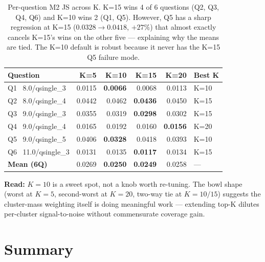 \documentclass[10pt,a4paper]{article}
\newcommand{\good}[1]{\textcolor{green!50!black}{\textbf{#1}}}
\newcommand{\bad}[1]{\textcolor{red!60!black}{#1}}
\begin{document}
\begin{table}[H]
\centering
\small
\begin{tabular}{l r r r r l}
\toprule
\textbf{Question} & \textbf{K=5} & \textbf{K=10} & \textbf{K=15} & \textbf{K=20} & \textbf{Best K} \\
\midrule
Q1 \ 8.0/qsingle\_3   & 0.0115 & \good{0.0066} & 0.0068 & 0.0113 & K=10 \\
Q2 \ 8.0/qsingle\_4   & 0.0442 & 0.0462 & \good{0.0436} & 0.0450 & K=15 \\
Q3 \ 9.0/qsingle\_3   & 0.0355 & 0.0319 & \good{0.0298} & 0.0302 & K=15 \\
Q4 \ 9.0/qsingle\_4   & 0.0165 & 0.0192 & 0.0160 & \good{0.0156} & K=20 \\
Q5 \ 9.0/qsingle\_5   & 0.0406 & \good{0.0328} & \bad{0.0418} & 0.0393 & K=10 \\
Q6 \ 11.0/qsingle\_3  & 0.0131 & 0.0135 & \good{0.0117} & 0.0134 & K=15 \\
\midrule
\textbf{Mean (6Q)}    & 0.0269 & \good{0.0250} & \good{0.0249} & 0.0258 & --- \\
\bottomrule
\end{tabular}
\caption{Per-question M2 JS across K. K=15 wins 4 of 6 questions (Q2, Q3, Q4, Q6) and K=10 wins 2 (Q1, Q5). However, Q5 has a sharp regression at K=15 ($0.0328 \to 0.0418$, $+27\%$) that almost exactly cancels K=15's wins on the other five — explaining why the means are tied. The K=10 default is robust because it never has the K=15 Q5 failure mode.}
\end{table}

\textbf{Read:} $K=10$ is a sweet spot, not a knob worth re-tuning. The bowl shape (worst at $K=5$, second-worst at $K=20$, two-way tie at $K=10/15$) suggests the cluster-mass weighting itself is doing meaningful work — extending top-K dilutes per-cluster signal-to-noise without commensurate coverage gain.

\section{Summary}
\end{document}
